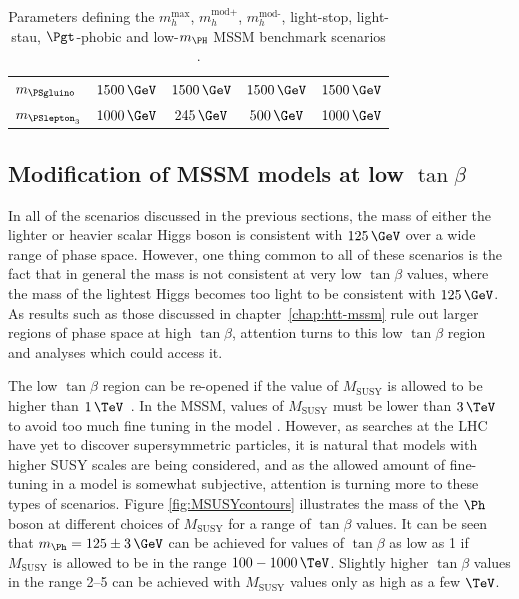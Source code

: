 \begin{table}[tbh]
\begin{tabular}{|l|c|c|c|c|}
$m_{\PSgluino}$ & $1500\,\GeV$ & $1500\,\GeV$  & $1500\,\GeV$ & $1500\,\GeV$ \\
$m_{\PSlepton_{3}}$ & $1000\,\GeV$ & $245\,\GeV$ & $500\,\GeV$ &  $1000\,\GeV$ \\
\hline
\end{tabular}
\caption[Parameters defining the $m_{h}^{\text{max}}$, $m_{h}^{\text{mod+}}$,
$m_{h}^{\text{mod-}}$, light-stop, light-stau, $\Pgt$-phobic and
low-$m_{\PH}$ MSSM benchmark scenarios.]{Parameters defining the $m_{h}^{\text{max}}$, $m_{h}^{\text{mod+}}$,
$m_{h}^{\text{mod-}}$, light-stop, light-stau, $\Pgt$-phobic and
low-$m_{\PH}$ MSSM benchmark scenarios \cite{HIG-13-021}.}
\label{tab:mssmbenchmarks}
\end{table}

\subsection{Modification of MSSM models at low $\tan\beta$}
\label{sec:lowtanbscenario}

In all of the scenarios discussed in the previous sections, the mass of either
the lighter or heavier scalar Higgs boson is consistent with $125\,\GeV$ over a
wide range of phase space. However, one thing common to all of these scenarios
is the fact that in general the mass is not consistent at very low $\tan\beta$
values, where the mass of the lightest Higgs becomes too light to be consistent
with $125\,\GeV$. As results such as those discussed in chapter~\ref{chap:htt-mssm} 
rule out larger regions of phase space at high $\tan\beta$, attention turns to this low
$\tan\beta$ region and analyses which could access it.

The low $\tan\beta$ region can be re-opened if the value of $M_{\text{SUSY}}$ is
allowed to be higher than $1\,\TeV$~\cite{Djouadi:2013vqa}. In the \ac{MSSM}, values of
$M_{\text{SUSY}}$ must be lower than $3\,\TeV$ to avoid too much fine tuning in
the model \cite{Barbieri198863}. However, as searches at the LHC have yet to discover supersymmetric
particles, it is natural that models with higher \ac{SUSY} scales are being
considered, and as the allowed amount of fine-tuning in a model is somewhat
subjective, attention is turning more to these types of scenarios. Figure
\ref{fig:MSUSYcontours} illustrates the mass of the $\Ph$ boson at different
choices of $M_{\text{SUSY}}$ for a range of $\tan\beta$ values. It can be seen
that $m_{\Ph} = 125\pm 3\,\GeV$ can be achieved for values of $\tan\beta$ as low
as 1 if $M_{\text{SUSY}}$ is allowed to be in the range $100-1000\,\TeV$.
Slightly higher $\tan\beta$ values in the range 2--5 can be achieved with
$M_{\text{SUSY}}$ values only as high as a few $\TeV$. 

